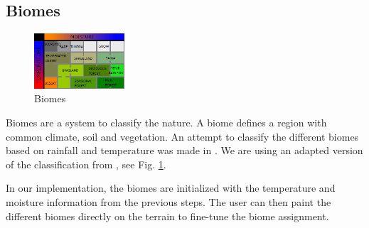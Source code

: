 \documentclass[journal, letterpaper]{IEEEtran}
\begin{document}
\subsection{Biomes}\label{Biomes}
\begin{figure}[htbp]
	\centering
		\includegraphics[width=0.30\textwidth]{images/BiomeCategories}
	\caption{Biomes}
	\label{fig:BiomeCategories}
\end{figure}
Biomes are a system to classify the nature. A biome defines a region with common climate, soil and vegetation.
An attempt to classify the different biomes based on rainfall and temperature was made in \cite{MariettaCollege.}. We are using an adapted version of the classification from \cite{JacobOlsen.2004}, see Fig. \ref{fig:BiomeCategories}.

In our implementation, the biomes are initialized with the temperature and moisture information from the previous steps. The user can then paint the different biomes directly on the terrain to fine-tune the biome assignment.
\end{document}
